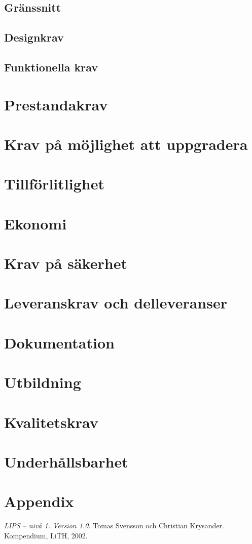 \documentclass[a4paper,12pt]{article}
\begin{document}
\subsection{Gränssnitt}
\subsection{Designkrav}
\subsection{Funktionella krav}


\section{Prestandakrav}

\section{Krav på möjlighet att uppgradera}

\section{Tillförlitlighet}

\section{Ekonomi}

\section{Krav på säkerhet}

\section{Leveranskrav och delleveranser}

\section{Dokumentation}



\section{Utbildning}


\section{Kvalitetskrav}


\section{Underhållsbarhet}

\appendix
\section{Appendix}




\begin{thebibliography}{99}
\textit{LIPS -- nivå 1. Version 1.0.} Tomas Svensson och Christian Krysander. Kompendium, LiTH, 2002.
\end{thebibliography}
\end{document}
